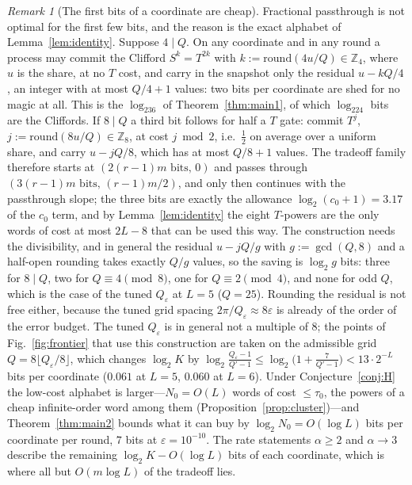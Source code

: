 \documentclass[aps,prx,twocolumn,superscriptaddress,nofootinbib,longbibliography]{revtex4-2}
\theoremstyle{plain}
\theoremstyle{definition}
\theoremstyle{remark}
\newtheorem{remark}{Remark}
\newcommand{\Z}{\mathbb{Z}}
\begin{document}
\begin{remark}[The first bits of a coordinate are cheap]\label{rem:firstbit}
Fractional passthrough is not optimal for the first few bits, and the reason is the exact alphabet of Lemma~\ref{lem:identity}. Suppose $4\mid Q$. On any coordinate and in any round a process may commit the Clifford $S^{k}=T^{2k}$ with $k:=\mathrm{round}(4u/Q)\in\Z_4$, where $u$ is the share, at no $T$ cost, and carry in the snapshot only the residual $u-kQ/4$, an integer with at most $Q/4+1$ values: two bits per coordinate are shed for no magic at all. This is the $\log_236$ of Theorem~\ref{thm:main1}, of which $\log_224$ bits are the Cliffords. If $8\mid Q$ a third bit follows for half a $T$ gate: commit $T^{j}$, $j:=\mathrm{round}(8u/Q)\in\Z_8$, at cost $j\bmod2$, i.e.\ $\tfrac12$ on average over a uniform share, and carry $u-jQ/8$, which has at most $Q/8+1$ values. The tradeoff family therefore starts at $(2(r-1)m\text{ bits},\,0)$ and passes through $(3(r-1)m\text{ bits},\,(r-1)m/2)$, and only then continues with the passthrough slope; the three bits are exactly the allowance $\log_2(c_0+1)=3.17$ of the $c_0$ term, and by Lemma~\ref{lem:identity} the eight $T$-powers are the only words of cost at most $2L-8$ that can be used this way. The construction needs the divisibility, and in general the residual $u-jQ/g$ with $g:=\gcd(Q,8)$ and a half-open rounding takes exactly $Q/g$ values, so the saving is $\log_2g$ bits: three for $8\mid Q$, two for $Q\equiv4\pmod 8$, one for $Q\equiv2\pmod 4$, and none for odd $Q$, which is the case of the tuned $Q_\varepsilon$ at $L=5$ ($Q=25$). Rounding the residual is not free either, because the tuned grid spacing $2\pi/Q_\varepsilon\approx8\varepsilon$ is already of the order of the error budget. The tuned $Q_\varepsilon$ is in general not a multiple of $8$; the points of Fig.~\ref{fig:frontier} that use this construction are taken on the admissible grid $Q=8\lfloor Q_\varepsilon/8\rfloor$, which changes $\log_2K$ by $\log_2\frac{Q_\varepsilon-1}{Q'-1}\le\log_2\big(1+\tfrac7{Q'-1}\big)<13\cdot2^{-L}$ bits per coordinate ($0.061$ at $L=5$, $0.060$ at $L=6$). Under Conjecture~\ref{conj:H} the low-cost alphabet is larger---$N_0=O(L)$ words of cost $\le\tau_0$, the powers of a cheap infinite-order word among them (Proposition~\ref{prop:cluster})---and Theorem~\ref{thm:main2} bounds what it can buy by $\log_2N_0=O(\log L)$ bits per coordinate per round, $7$ bits at $\varepsilon=10^{-10}$. The rate statements $\alpha\ge2$ and $\alpha\to3$ describe the remaining $\log_2K-O(\log L)$ bits of each coordinate, which is where all but $O(m\log L)$ of the tradeoff lies.
\end{remark}
\end{document}
